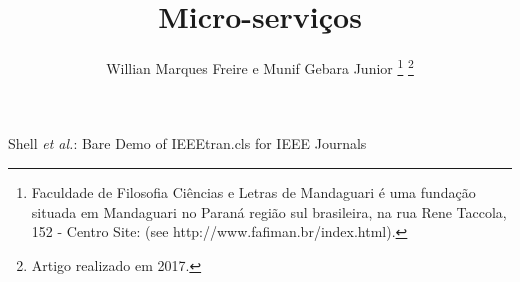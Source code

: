 \documentclass[journal]{IEEEtran}
\begin{document}
%
\title{Micro-serviços}
%
%
%

\author{Willian Marques Freire e
        Munif Gebara Junior%
\thanks{Faculdade de Filosofia Ciências e Letras de Mandaguari é uma fundação
situada em Mandaguari no Paraná região sul brasileira,
na rua Rene Taccola, 152 - Centro Site: (see http://www.fafiman.br/index.html).}%
\thanks{Artigo realizado em 2017.}}

% 
%



%
{Shell \MakeLowercase{\textit{et al.}}: Bare Demo of IEEEtran.cls for IEEE Journals}
% 
\end{document}
